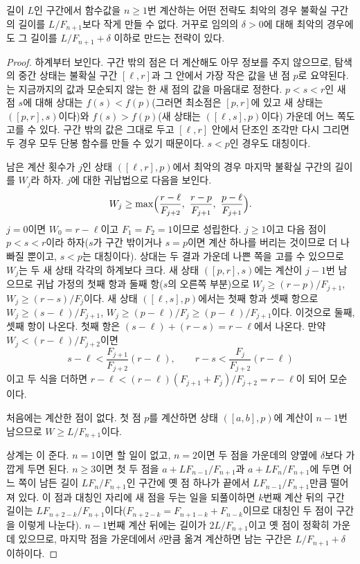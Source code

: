 \begin{theorem}[Kiefer]
\label{thm:fibonacci-optimal}
길이 $L$인 구간에서 함수값을 $n\ge1$번 계산하는 어떤 전략도 최악의 경우 불확실 구간의 길이를 $L/F_{n+1}$보다 작게 만들 수 없다. 거꾸로 임의의 $\delta>0$에 대해 최악의 경우에도 그 길이를 $L/F_{n+1}+\delta$ 이하로 만드는 전략이 있다.
\end{theorem}

\begin{proof}
하계부터 보인다. 구간 밖의 점은 더 계산해도 아무 정보를 주지 않으므로, 탐색의 중간 상태는 불확실 구간 $[\ell,r]$과 그 안에서 가장 작은 값을 낸 점 $p$로 요약된다. 는 지금까지의 값과 모순되지 않는 한 새 점의 값을 마음대로 정한다. $p<s<r$인 새 점 $s$에 대해 상대는 $f(s)<f(p)$(그러면 최소점은 $[p,r]$에 있고 새 상태는 $([p,r],s)$이다)와 $f(s)>f(p)$(새 상태는 $([\ell,s],p)$이다) 가운데 어느 쪽도 고를 수 있다. 구간 밖의 값은 그대로 두고 $[\ell,r]$ 안에서 단조인 조각만 다시 그리면 두 경우 모두 단봉 함수를 만들 수 있기 때문이다. $s<p$인 경우도 대칭이다.

남은 계산 횟수가 $j$인 상태 $([\ell,r],p)$에서 최악의 경우 마지막 불확실 구간의 길이를 $W_j$라 하자. $j$에 대한 귀납법으로 다음을 보인다.
\[
W_j\ge\max\Bigl(\frac{r-\ell}{F_{j+2}},\ \frac{r-p}{F_{j+1}},\ \frac{p-\ell}{F_{j+1}}\Bigr).
\]
$j=0$이면 $W_0=r-\ell$이고 $F_1=F_2=1$이므로 성립한다. $j\ge1$이고 다음 점이 $p<s<r$이라 하자($s$가 구간 밖이거나 $s=p$이면 계산 하나를 버리는 것이므로 더 나빠질 뿐이고, $s<p$는 대칭이다). 상대는 두 결과 가운데 나쁜 쪽을 고를 수 있으므로 $W_j$는 두 새 상태 각각의 하계보다 크다. 새 상태 $([p,r],s)$에는 계산이 $j-1$번 남으므로 귀납 가정의 첫째 항과 둘째 항($s$의 오른쪽 부분)으로 $W_j\ge(r-p)/F_{j+1}$, $W_j\ge(r-s)/F_j$이다. 새 상태 $([\ell,s],p)$에서는 첫째 항과 셋째 항으로 $W_j\ge(s-\ell)/F_{j+1}$, $W_j\ge(p-\ell)/F_j\ge(p-\ell)/F_{j+1}$이다. 이것으로 둘째, 셋째 항이 나온다. 첫째 항은 $(s-\ell)+(r-s)=r-\ell$에서 나온다. 만약 $W_j<(r-\ell)/F_{j+2}$이면
\[
s-\ell<\frac{F_{j+1}}{F_{j+2}}(r-\ell),\qquad r-s<\frac{F_j}{F_{j+2}}(r-\ell)
\]
이고 두 식을 더하면 $r-\ell<(r-\ell)(F_{j+1}+F_j)/F_{j+2}=r-\ell$이 되어 모순이다.

처음에는 계산한 점이 없다. 첫 점 $p$를 계산하면 상태 $([a,b],p)$에 계산이 $n-1$번 남으므로 $W\ge L/F_{n+1}$이다.

상계는 이 준다. $n=1$이면 할 일이 없고, $n=2$이면 두 점을 가운데의 양옆에 $\delta$보다 가깝게 두면 된다. $n\ge3$이면 첫 두 점을 $a+LF_{n-1}/F_{n+1}$과 $a+LF_n/F_{n+1}$에 두면 어느 쪽이 남든 길이 $LF_n/F_{n+1}$인 구간에 옛 점 하나가 끝에서 $LF_{n-1}/F_{n+1}$만큼 떨어져 있다. 이 점과 대칭인 자리에 새 점을 두는 일을 되풀이하면 $k$번째 계산 뒤의 구간 길이는 $LF_{n+2-k}/F_{n+1}$이다($F_{n+2-k}=F_{n+1-k}+F_{n-k}$이므로 대칭인 두 점이 구간을 이렇게 나눈다). $n-1$번째 계산 뒤에는 길이가 $2L/F_{n+1}$이고 옛 점이 정확히 가운데 있으므로, 마지막 점을 가운데에서 $\delta$만큼 옮겨 계산하면 남는 구간은 $L/F_{n+1}+\delta$ 이하이다.
\end{proof}

